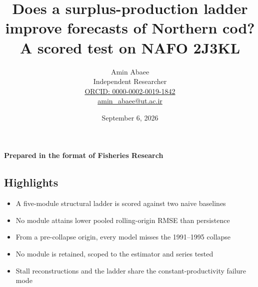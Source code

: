 \documentclass[11pt]{article}
\providecommand{\tightlist}{\setlength{\itemsep}{0pt}\setlength{\parskip}{0pt}}
\begin{document}
\title{Does a surplus-production ladder improve forecasts of Northern cod? A scored test on NAFO 2J3KL}
\author{Amin Abaee\\[0.35em]
{\small Independent Researcher}\\[0.55em]
{\small\href{https://orcid.org/0000-0002-0019-1842}{ORCID: 0000-0002-0019-1842}}\\[0.3em]
{\small\href{mailto:amin\_abaee@ut.ac.ir}{amin\_abaee@ut.ac.ir}}}
\date{September 6, 2026}
\maketitle

{\centering\small \textbf{Prepared in the format of Fisheries Research}\par}

\subsection{Highlights}\label{highlights}

\begin{itemize}
\tightlist
\item
  A five-module structural ladder is scored against two naive baselines
\item
  No module attains lower pooled rolling-origin RMSE than persistence
\item
  From a pre-collapse origin, every model misses the 1991--1995 collapse
\item
  No module is retained, scoped to the estimator and series tested
\item
  Stall reconstructions and the ladder share the constant-productivity
  failure mode
\end{itemize}
\end{document}
